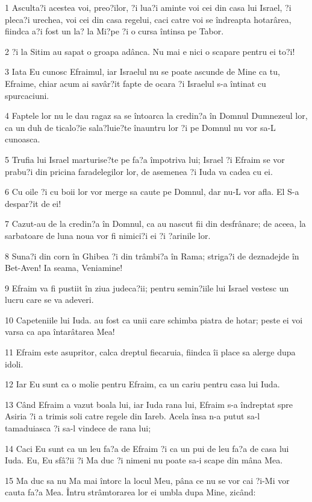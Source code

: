 \par 1 Asculta?i acestea voi, preo?ilor, ?i lua?i aminte voi cei din casa lui Israel, ?i pleca?i urechea, voi cei din casa regelui, caci catre voi se îndreapta hotarârea, fiindca a?i fost un la? la Mi?pe ?i o cursa întinsa pe Tabor.
\par 2 ?i la Sitim au sapat o groapa adânca. Nu mai e nici o scapare pentru ei to?i!
\par 3 Iata Eu cunosc Efraimul, iar Israelul nu se poate ascunde de Mine ca tu, Efraime, chiar acum ai savâr?it fapte de ocara ?i Israelul s-a întinat cu spurcaciuni.
\par 4 Faptele lor nu le dau ragaz sa se întoarca la credin?a în Domnul Dumnezeul lor, ca un duh de ticalo?ie sala?luie?te înauntru lor ?i pe Domnul nu vor sa-L cunoasca.
\par 5 Trufia lui Israel marturise?te pe fa?a împotriva lui; Israel ?i Efraim se vor prabu?i din pricina faradelegilor lor, de asemenea ?i Iuda va cadea cu ei.
\par 6 Cu oile ?i cu boii lor vor merge sa caute pe Domnul, dar nu-L vor afla. El S-a despar?it de ei!
\par 7 Cazut-au de la credin?a în Domnul, ca au nascut fii din desfrânare; de aceea, la sarbatoare de luna noua vor fi nimici?i ei ?i ?arinile lor.
\par 8 Suna?i din corn în Ghibea ?i din trâmbi?a în Rama; striga?i de deznadejde în Bet-Aven! Ia seama, Veniamine!
\par 9 Efraim va fi pustiit în ziua judeca?ii; pentru semin?iile lui Israel vestesc un lucru care se va adeveri.
\par 10 Capeteniile lui Iuda. au fost ca unii care schimba piatra de hotar; peste ei voi varsa ca apa întarâtarea Mea!
\par 11 Efraim este asupritor, calca dreptul fiecaruia, fiindca îi place sa alerge dupa idoli.
\par 12 Iar Eu sunt ca o molie pentru Efraim, ca un cariu pentru casa lui Iuda.
\par 13 Când Efraim a vazut boala lui, iar Iuda rana lui, Efraim s-a îndreptat spre Asiria ?i a trimis soli catre regele din Iareb. Acela însa n-a putut sa-l tamaduiasca ?i sa-l vindece de rana lui;
\par 14 Caci Eu sunt ca un leu fa?a de Efraim ?i ca un pui de leu fa?a de casa lui Iuda. Eu, Eu sfâ?ii ?i Ma duc ?i nimeni nu poate sa-i scape din mâna Mea.
\par 15 Ma duc sa nu Ma mai întorc la locul Meu, pâna ce nu se vor cai ?i-Mi vor cauta fa?a Mea. Întru strâmtorarea lor ei umbla dupa Mine, zicând:

